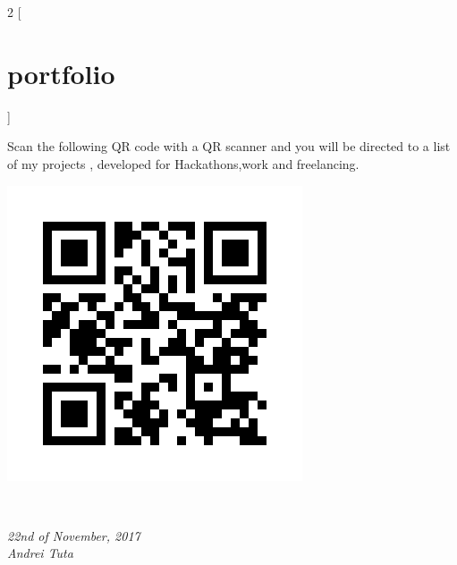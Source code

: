 \documentclass[]{friggeri-cv}
\begin{document}
\begin{multicols}{2}
[
\section{portfolio}
]

Scan the following QR code with a QR scanner and you will be directed to a list of my projects , developed for Hackathons,work and freelancing.

   \begin{flushright}
   \includegraphics[scale=0.30]{img/static_qr_code_without_logo.jpg}
\end{flushright}


\end{multicols}
\\
\begin{flushleft}
\emph{22nd of November, 2017}
\\
\emph{Andrei Tuta}
\end{flushleft}
\end{document}
